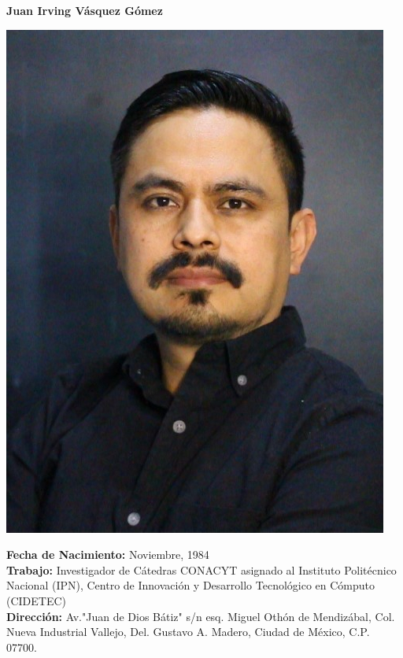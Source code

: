 \documentclass[10pt]{article}
\begin{document}
\begin{center}
{\bf {\LARGE Juan Irving Vásquez Gómez}}
\vspace{0.5cm}

\begin{minipage}[b]{0.30\linewidth}
	\centering
	\includegraphics[width=\textwidth]{jivg36}
\end{minipage}
\hspace{0.5cm}
\begin{minipage}[b]{0.6\linewidth}
\textbf{Fecha de Nacimiento:} Noviembre, 1984 \\
\textbf{Trabajo:} Investigador de Cátedras CONACYT asignado al Instituto Politécnico Nacional (IPN), Centro de Innovación y Desarrollo Tecnológico en Cómputo (CIDETEC) \href{https://www.cidetec.ipn.mx/}{\faExternalLink} \\ 
\textbf{Dirección:} Av."Juan de Dios Bátiz" s/n esq. Miguel Othón de Mendizábal, 
Col. Nueva Industrial Vallejo, Del. Gustavo A. Madero, Ciudad de México, C.P. 07700. \\

\end{minipage}
\end{center}
\end{document}
